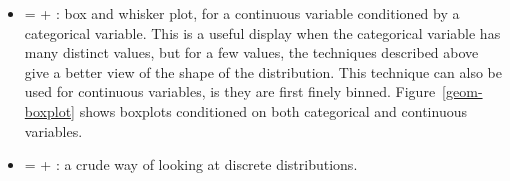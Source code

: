 \begin{itemize}
  \item {} =  + : box and whisker plot, for a continuous variable conditioned by a categorical variable.  This is a useful display when the categorical variable has many distinct values, but for a few values, the techniques described above give a better view of the shape of the distribution.  This technique can also be used for continuous variables, is they are first finely binned.   Figure~\ref{geom-boxplot} shows boxplots conditioned on both categorical and continuous variables.
  
    
  
  \item {} =  + : a crude way of looking at discrete distributions.
  
    
  
  

\end{itemize}
